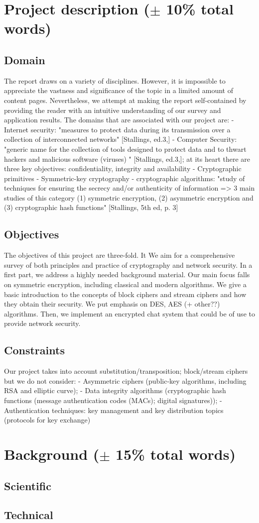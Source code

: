 \section{Project description ($\pm$ 10\% total words) }
\subsection{Domain}
The report draws on a variety of disciplines. However, it is impossible to appreciate the vastness and significance of the topic in a limited amount of content pages. Nevertheless, we attempt at making the report self-contained by providing the reader with an intuitive understanding of our survey and application results.
The domains that are associated with our project are: 
-	Internet security: "measures to protect data during its transmission over a collection of interconnected networks" [Stallings, ed.3,]
-	Computer Security: "generic name for the collection of tools designed to protect data and to thwart hackers and malicious software (viruses) " [Stallings, ed.3,]; at its heart there are three key objectives: confidentiality, integrity and availability
-	Cryptographic primitives
-	Symmetric-key cryptography
-	cryptographic algorithms: "study of techniques for ensuring the secrecy and/or authenticity of information => 3 main studies of this category (1) symmetric encryption, (2) asymmetric encryption and (3) cryptographic hash functions" [Stallings, 5th ed, p. 3]



\subsection{Objectives}
The objectives of this project are three-fold. It We aim for a comprehensive survey of both principles and practice of cryptography and network security. In a first part, we address a highly needed background material.  Our main focus falls on symmetric encryption, including classical and modern algorithms. We give a basic introduction to the concepts of block ciphers and stream ciphers and how they obtain their security. We put emphasis on DES, AES (+ other??) algorithms. Then, we implement an encrypted chat system that could be of use to provide network security.
\subsection{Constraints}
Our project takes into account substitution/transposition; block/stream ciphers but we do not consider:
-	Asymmetric ciphers (public-key algorithms, including RSA and elliptic curve); 
-	Data integrity algorithms (cryptographic hash functions (message authentication codes (MACs); digital signatures)); 
-	Authentication techniques: key management and key distribution topics (protocols for key exchange)

\section{Background ($\pm$ 15\% total words)}
\subsection{Scientific}
\subsection{Technical}
